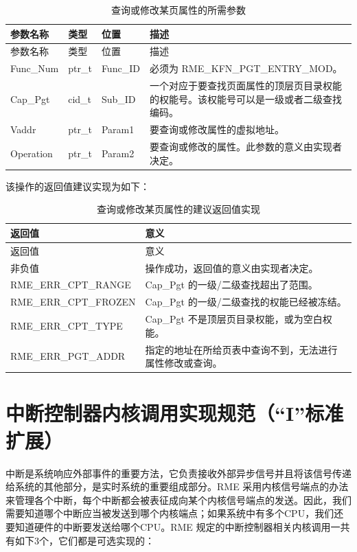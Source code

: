 \begin{xltabular}{\textwidth}{@{}>{\hsize\raggedright\arraybackslash}X>{\hsize\raggedright\arraybackslash}X>{\hsize\raggedright\arraybackslash}X>{\hsize\raggedright\arraybackslash}X@{}}
\caption{查询或修改某页属性的所需参数}\label{tab:8-13-query-or-modify-page-attributes-parameters}\\
\toprule
参数名称 & 类型 & 位置 & 描述\tabularnewline
\endfirsthead
\toprule
参数名称 & 类型 & 位置 & 描述\tabularnewline
\midrule
\endhead
\bottomrule
\endlastfoot
Func\_Num & ptr\_t & Func\_ID & 必须为 RME\_KFN\_PGT\_ENTRY\_MOD。\tabularnewline
Cap\_Pgt & cid\_t & Sub\_ID &
一个对应于要查找页面属性的顶层页目录权能的权能号。该权能号可以是一级或者二级查找编码。\tabularnewline
Vaddr & ptr\_t & Param1 & 要查询或修改属性的虚拟地址。\tabularnewline
Operation & ptr\_t & Param2 &
要查询或修改的属性。此参数的意义由实现者决定。\tabularnewline
\end{xltabular}

该操作的返回值建议实现为如下：

\begin{xltabular}{\textwidth}{@{}>{\hsize\raggedright\arraybackslash}X>{\hsize\raggedright\arraybackslash}X@{}}
\caption{查询或修改某页属性的建议返回值实现}\label{tab:8-14-query-or-modify-page-attributes-suggested-return-values}\\
\toprule
返回值 & 意义\tabularnewline
\endfirsthead
\toprule
返回值 & 意义\tabularnewline
\midrule
\endhead
\bottomrule
\endlastfoot
    非负值 & 操作成功，返回值的意义由实现者决定。\tabularnewline
    RME\_ERR\_CPT\_RANGE & Cap\_Pgt 的一级/二级查找超出了范围。\tabularnewline
    RME\_ERR\_CPT\_FROZEN & Cap\_Pgt 的一级/二级查找的权能已经被冻结。\tabularnewline
    RME\_ERR\_CPT\_TYPE & Cap\_Pgt 不是顶层页目录权能，或为空白权能。\tabularnewline
    RME\_ERR\_PGT\_ADDR & 指定的地址在所给页表中查询不到，无法进行属性修改或查询。\tabularnewline
\end{xltabular}

\section{中断控制器内核调用实现规范（``I''标准扩展）}\label{sec:8-interrupt-controller-kernel-calls}
\nopagebreak[4]

中断是系统响应外部事件的重要方法，它负责接收外部异步信号并且将该信号传递给系统的其他部分，是实时系统的重要组成部分。RME 采用内核信号端点的办法来管理各个中断，每个中断都会被表征成向某个内核信号端点的发送。因此，我们需要知道哪个中断应当被发送到哪个内核端点；如果系统中有多个CPU，我们还要知道硬件的中断要发送给哪个CPU。RME 规定的中断控制器相关内核调用一共有如下3个，它们都是可选实现的：

